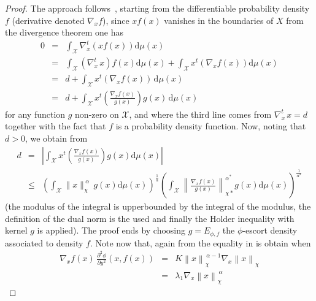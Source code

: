 \documentclass[english,sort&compress]{elsarticle}
\theoremstyle{definition}
\theoremstyle{plain}
\theoremstyle{plain}
\def\dmu{\mathrm{d}\mu}
\def\X{\mathcal{X}}
\begin{document}
\begin{proof}
  The   approach   follows~\cite{Ber13},   starting  from   the   differentiable
  probability  density $f$  (derivative denoted  $\nabla_x f$),  since  $x f(x)$
  vanishes in the boundaries of $X$ from the divergence theorem one has
  \begin{eqnarray*}
  0 & = & \int_\X \nabla_x^t \left( x f(x) \right) \dmu(x)\\[2mm]
  & = & \int_\X \left( \nabla_x^t \, x \right) f(x) \dmu(x) + \int_\X x^t \left(
  \nabla_x f(x) \right) \dmu(x)\\[2mm]
  & = & d  + \int_\X x^t \left( \nabla_x f(x) \right) \, \dmu(x)\\[2mm]
  & = & d + \int_\X x^t \left( \frac{\nabla_x f(x)}{g(x)} \right) g(x) \,
  \dmu(x)
  \end{eqnarray*}
  for any  function $g$ non-zero  on $\X$, and  where the third line  comes from
  $\nabla_x^t \, x = d$ together with the fact that $f$ is a probability density
  function.  Now, noting that $d > 0$, we obtain from \cite[Lemma 2]{Ber13}
  \begin{eqnarray*}
  d & = & \left| \int_\X x^t \left( \frac{\nabla_x f(x)}{g(x)} \right) g(x)
  \dmu(x) \right|\\[2mm]
  & \le & \left( \int_\X \|x\|_\chi^{\: \alpha} \, g(x) \dmu(x)
  \right)^{\frac{1}{\alpha}} \left( \int_\X \left\| \frac{\nabla_x
  f(x)}{g(x)}\right\|_{\chi*}^{\alpha^*} g(x) \dmu(x) \right)^{\frac{1}{\alpha^*}}
  \end{eqnarray*}
  (the modulus of  the integral is upperbounded by the  integral of the modulus,
  the definition of the dual norm  is the used and finally the Holder inequality
  with kernel $g$ is applied).  The  proof ends by choosing $g = E_{\phi,f}$ the
  $\phi$-escort density  associated to  density $f$. Note  now that,  again from
  \cite[Lemma~2]{Ber13} the equality in is obtain when
  \begin{eqnarray*}
  \nabla_x  f(x) \,  \frac{\partial^2 \phi}{\partial  y^2}  (x,f(x)) &  = & K
  \left\| x \right\|_\chi^{\, \alpha-1} \nabla_x \left\| x \right\|_\chi \\
  & = & \lambda_1 \nabla_x \left\| x \right\|_\chi^{\, \alpha}

\end{eqnarray*}
\end{proof}
\end{document}
